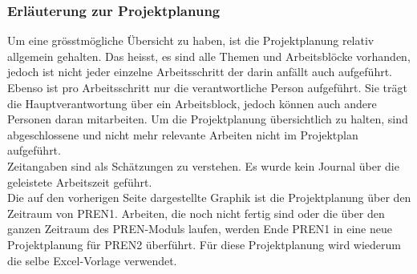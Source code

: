 \subsubsection{Erläuterung zur Projektplanung}
Um eine grösstmögliche Übersicht zu haben, ist die Projektplanung relativ allgemein gehalten. Das heisst, es sind alle Themen und Arbeitsblöcke vorhanden, jedoch ist nicht jeder einzelne Arbeitsschritt der darin anfällt auch aufgeführt. Ebenso ist pro Arbeitsschritt nur die verantwortliche Person aufgeführt. Sie trägt die Hauptverantwortung über ein Arbeitsblock, jedoch können auch andere Personen daran mitarbeiten. Um die Projektplanung übersichtlich zu halten, sind abgeschlossene und
nicht mehr relevante Arbeiten nicht im Projektplan aufgeführt.\\
Zeitangaben sind als Schätzungen zu verstehen. Es wurde kein Journal über die geleistete Arbeitszeit geführt.\\
Die auf den vorherigen Seite dargestellte Graphik ist die Projektplanung über den Zeitraum von PREN1. Arbeiten, die noch nicht fertig sind oder die über den ganzen Zeitraum des PREN-Moduls laufen, werden Ende PREN1 in eine neue Projektplanung für PREN2 überführt. Für diese Projektplanung wird wiederum die selbe Excel-Vorlage verwendet. 
